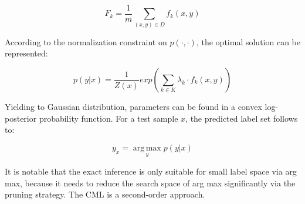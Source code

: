 \begin{equation}\label{eq:CMLExpect}
F_{k} = \frac{1}{m}\sum_{(x,y) \in D}f_{k}(x,y)
\end{equation}

According to the normalization constraint on $p(\cdot,\cdot)$, the optimal solution can be represented:

\begin{equation}\label{eq:CMLOptimal}
p(y|x) = \frac{1}{Z(x)}exp(\sum_{k \in K}\lambda_{k} \cdot f_{k}(x,y))
\end{equation}

Yielding to Gaussian distribution, parameters can be found in a convex log-posterior probability function. For a test sample $x$, the predicted label set follows to:

\begin{equation}\label{eq:CMLLabel}
y_{x} = \operatorname*{arg\,max}_{y} p(y|x)
\end{equation}

It is notable that the exact inference is only suitable for small label space via arg max, because it needs to reduce the search space of arg max significantly via the pruning strategy. The CML is a second-order approach.
